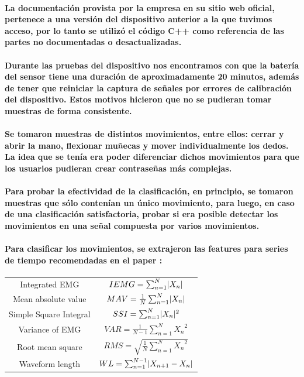 \documentclass{article}
\DeclarePairedDelimiter\abs{\lvert}{\rvert}%
\begin{document}
\paragraph{
La documentación provista por la empresa en su sitio web oficial, pertenece a una versión del dispositivo anterior a la que tuvimos acceso, por lo tanto se utilizó el código C++ como referencia de las partes no documentadas o desactualizadas.
}
\paragraph{
Durante las pruebas del dispositivo nos encontramos con que la batería del sensor tiene una duración de aproximadamente 20 minutos, además de tener que reiniciar la captura de señales por errores de calibración del dispositivo. Estos motivos hicieron que no se pudieran tomar muestras de forma consistente.
}
\paragraph{
Se tomaron muestras de distintos movimientos, entre ellos: cerrar y abrir la mano, flexionar muñecas y mover individualmente los dedos. La idea que se tenía era poder diferenciar dichos movimientos para que los usuarios pudieran crear contraseñas más complejas.
}
\paragraph{
Para probar la efectividad de la clasificación, en principio, se tomaron muestras que sólo contenían un único movimiento, para luego, en caso de una clasificación satisfactoria, probar si era posible detectar los movimientos en una señal compuesta por varios movimientos.
}
\paragraph{
Para clasificar los movimientos, se extrajeron las features para series de tiempo recomendadas en el paper \cite{angkoon2009}:
}

\begin{center}
\begin{tabular}{ c c }
 Integrated EMG & $IEMG = \sum_{n=1}^{N} \abs{X_n}$ \\
 Mean absolute value & $MAV = \frac{1}{N} \sum_{n=1}^{N} \abs{X_n}$ \\
 Simple Square Integral & $SSI = \sum_{n=1}^{N}\abs{X_n}^2$ \\
 Variance of EMG & $VAR = \frac{1}{N-1} \sum_{n=1}^{N} {X_n}^2$ \\
 Root mean square & $RMS = \sqrt{\frac{1}{N} \sum_{n=1}^{N} {X_n}^2}$ \\
 Waveform length & $WL = \sum_{n=1}^{N-1} \abs{X_{n + 1} - X_n}$
\end{tabular}
\end{center}
\end{document}
